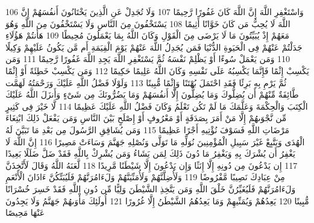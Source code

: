 {\tiny\colorbox{cl_aya}{106}} وَاسْتَغْفِرِ اللَّهَ إِنَّ اللَّهَ كَانَ غَفُورًا رَّحِيمًا
{\tiny\colorbox{cl_aya}{107}} وَلَا تُجَدِلْ عَنِ الَّذِينَ يَخْتَانُونَ أَنفُسَهُمْ إِنَّ اللَّهَ لَا يُحِبُّ مَن كَانَ خَوَّانًا أَثِيمًا
{\tiny\colorbox{cl_aya}{108}} يَسْتَخْفُونَ مِنَ النَّاسِ وَلَا يَسْتَخْفُونَ مِنَ اللَّهِ وَهُوَ مَعَهُمْ إِذْ يُبَيِّتُونَ مَا لَا يَرْضَى مِنَ الْقَوْلِ وَكَانَ اللَّهُ بِمَا يَعْمَلُونَ مُحِيطًا
{\tiny\colorbox{cl_aya}{109}} هَأَنتُمْ هَؤُلَاءِ جَدَلْتُمْ عَنْهُمْ فِى الْحَيَوةِ الدُّنْيَا فَمَن يُجَدِلُ اللَّهَ عَنْهُمْ يَوْمَ الْقِيَمَةِ أَم مَّن يَكُونُ عَلَيْهِمْ وَكِيلًا
{\tiny\colorbox{cl_aya}{110}} وَمَن يَعْمَلْ سُوءًا أَوْ يَظْلِمْ نَفْسَهُ ثُمَّ يَسْتَغْفِرِ اللَّهَ يَجِدِ اللَّهَ غَفُورًا رَّحِيمًا
{\tiny\colorbox{cl_aya}{111}} وَمَن يَكْسِبْ إِثْمًا فَإِنَّمَا يَكْسِبُهُ عَلَى نَفْسِهِ وَكَانَ اللَّهُ عَلِيمًا حَكِيمًا
{\tiny\colorbox{cl_aya}{112}} وَمَن يَكْسِبْ خَطِئَةً أَوْ إِثْمًا ثُمَّ يَرْمِ بِهِ بَرِئًا فَقَدِ احْتَمَلَ بُهْتَنًا وَإِثْمًا مُّبِينًا
{\tiny\colorbox{cl_aya}{113}} وَلَوْلَا فَضْلُ اللَّهِ عَلَيْكَ وَرَحْمَتُهُ لَهَمَّت طَّائِفَةٌ مِّنْهُمْ أَن يُضِلُّوكَ وَمَا يُضِلُّونَ إِلَّا أَنفُسَهُمْ وَمَا يَضُرُّونَكَ مِن شَىْءٍ وَأَنزَلَ اللَّهُ عَلَيْكَ الْكِتَبَ وَالْحِكْمَةَ وَعَلَّمَكَ مَا لَمْ تَكُن تَعْلَمُ وَكَانَ فَضْلُ اللَّهِ عَلَيْكَ عَظِيمًا
{\tiny\colorbox{cl_aya}{114}} لَّا خَيْرَ فِى كَثِيرٍ مِّن نَّجْوَىهُمْ إِلَّا مَنْ أَمَرَ بِصَدَقَةٍ أَوْ مَعْرُوفٍ أَوْ إِصْلَحٍ بَيْنَ النَّاسِ وَمَن يَفْعَلْ ذَلِكَ ابْتِغَاءَ مَرْضَاتِ اللَّهِ فَسَوْفَ نُؤْتِيهِ أَجْرًا عَظِيمًا
{\tiny\colorbox{cl_aya}{115}} وَمَن يُشَاقِقِ الرَّسُولَ مِن بَعْدِ مَا تَبَيَّنَ لَهُ الْهُدَى وَيَتَّبِعْ غَيْرَ سَبِيلِ الْمُؤْمِنِينَ نُوَلِّهِ مَا تَوَلَّى وَنُصْلِهِ جَهَنَّمَ وَسَاءَتْ مَصِيرًا
{\tiny\colorbox{cl_aya}{116}} إِنَّ اللَّهَ لَا يَغْفِرُ أَن يُشْرَكَ بِهِ وَيَغْفِرُ مَا دُونَ ذَلِكَ لِمَن يَشَاءُ وَمَن يُشْرِكْ بِاللَّهِ فَقَدْ ضَلَّ ضَلَلًا بَعِيدًا
{\tiny\colorbox{cl_aya}{117}} إِن يَدْعُونَ مِن دُونِهِ إِلَّا إِنَثًا وَإِن يَدْعُونَ إِلَّا شَيْطَنًا مَّرِيدًا
{\tiny\colorbox{cl_aya}{118}} لَّعَنَهُ اللَّهُ وَقَالَ لَأَتَّخِذَنَّ مِنْ عِبَادِكَ نَصِيبًا مَّفْرُوضًا
{\tiny\colorbox{cl_aya}{119}} وَلَأُضِلَّنَّهُمْ وَلَأُمَنِّيَنَّهُمْ وَلَءَامُرَنَّهُمْ فَلَيُبَتِّكُنَّ ءَاذَانَ الْأَنْعَمِ وَلَءَامُرَنَّهُمْ فَلَيُغَيِّرُنَّ خَلْقَ اللَّهِ وَمَن يَتَّخِذِ الشَّيْطَنَ وَلِيًّا مِّن دُونِ اللَّهِ فَقَدْ خَسِرَ خُسْرَانًا مُّبِينًا
{\tiny\colorbox{cl_aya}{120}} يَعِدُهُمْ وَيُمَنِّيهِمْ وَمَا يَعِدُهُمُ الشَّيْطَنُ إِلَّا غُرُورًا
{\tiny\colorbox{cl_aya}{121}} أُولَئِكَ مَأْوَىهُمْ جَهَنَّمُ وَلَا يَجِدُونَ عَنْهَا مَحِيصًا
